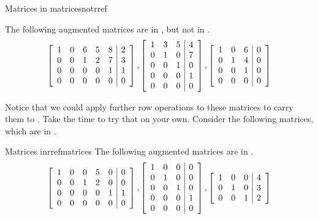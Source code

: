 \begin{example}{Matrices in \EF}{matricesnotrref}


The following augmented matrices are in \ef, but not in \rref.
\begin{equation*}
\left[
\begin{array}{rrrrr|r}
1 & 0 & 6 & 5 & 8 & 2 \\
0 & 0 & 1 & 2 & 7 & 3 \\
0 & 0 & 0 & 0 & 1 & 1 \\
0 & 0 & 0 & 0 & 0 & 0
\end{array}
\right] ,\left[
\begin{array}{rrr|r}
1 & 3 & 5 & 4 \\
0 & 1 & 0 & 7 \\
0 & 0 & 1 & 0 \\
0 & 0 & 0 & 1 \\
0 & 0 & 0 & 0
\end{array}
\right], \left[
\begin{array}{rrr|r}
1 & 0 & 6 & 0 \\
0 & 1 & 4 & 0 \\
0 & 0 & 1 & 0 \\
0 & 0 & 0 & 0
\end{array}
\right]
\end{equation*}
\end{example}

Notice that we could apply further row operations to these matrices to carry them to \rref. Take the time to try that on your own. 
Consider the following matrices, which are in \rref. 

\begin{example}{Matrices in\RREF}{rrefmatrices}
The following augmented matrices are in \rref.
\begin{equation*}
\left[
\begin{array}{rrrrr|r}
1 & 0 & 0 & 5 & 0 & 0 \\
0 & 0 & 1 & 2 & 0 & 0 \\
0 & 0 & 0 & 0 & 1 & 1 \\
0 & 0 & 0 & 0 & 0 & 0
\end{array}
\right] ,\left[
\begin{array}{rrr|r}
1 & 0 & 0 & 0 \\
0 & 1 & 0 & 0 \\
0 & 0 & 1 & 0 \\
0 & 0 & 0 & 1 \\
0 & 0 & 0 & 0
\end{array}
\right] , \left[
\begin{array}{rrr|r}
1 & 0 & 0 & 4 \\
0 & 1 & 0 & 3 \\
0 & 0 & 1 & 2 
\end{array}
\right]
\end{equation*}
\end{example}

